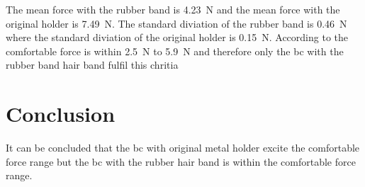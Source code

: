 The mean force with the rubber band is \SI{4.23}{\newton} and the mean force with the original holder is \SI{7.49}{\newton}. The standard diviation of the rubber band is \SI{0.46}{\newton} where the standard diviation of the original holder is \SI{0.15}{\newton}. According to \citep{ANSI_S35} the comfortable force is within \SI{2.5}{\newton} to \SI{5.9}{\newton} and therefore only the \gls{bc} with the rubber band hair band fulfil this chritia 

\section*{Conclusion}

It can be concluded that the \gls{bc} with original metal holder excite the comfortable force range but the \gls{bc} with the rubber hair band is within the comfortable force range.


